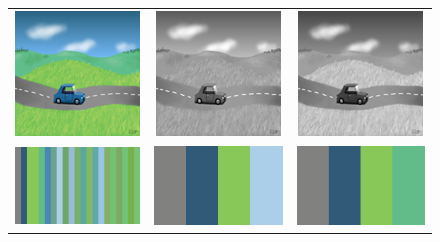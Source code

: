 \begin{figure}[t]
\begin{center}
\begin{tabular}{ccc}
\includegraphics[width=0.27\linewidth]{fig/Voiture.png} &
\includegraphics[width=0.27\linewidth]{fig/Voiture-sparse_dr-colorT03_resize01.png} &
\includegraphics[width=0.27\linewidth]{fig/Voiture-sparse_dr-colorT02_resize01.png} \\
\includegraphics[width=0.27\linewidth]{fig/Voiture-visD-all.png} &
\includegraphics[width=0.27\linewidth]{fig/Voiture-visD-colorT03.png} & 
\includegraphics[width=0.27\linewidth]{fig/Voiture-visD-colorT02.png} \\

\end{tabular}
\end{center}
\end{figure}

